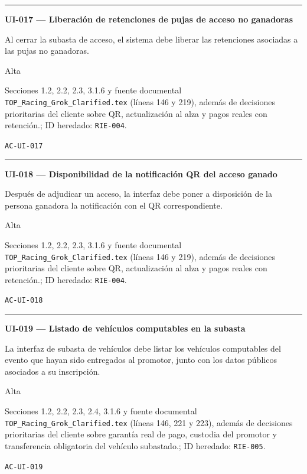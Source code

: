 \documentclass[10pt,letterpaper]{article}
\begin{document}
\vspace{0.25em}\hrule\vspace{0.65em}
\noindent\textbf{UI-017 --- Liberación de retenciones de pujas de acceso no ganadoras}\par
\begin{description}[style=nextline,leftmargin=3.15cm,labelwidth=2.8cm,font=\normalfont\bfseries]
\item[Obligación] Al cerrar la subasta de acceso, el sistema debe liberar las retenciones asociadas a las pujas no ganadoras.
\item[Prioridad] Alta
\item[Procedencia] Secciones 1.2, 2.2, 2.3, 3.1.6 y fuente documental \texttt{TOP\_Racing\_Grok\_Clarified.tex} (líneas 146 y 219), además de decisiones prioritarias del cliente sobre QR, actualización al alza y pagos reales con retención.; ID heredado: \texttt{RIE-004}.
\item[Verificación] \texttt{AC-UI-017}
\end{description}
\vspace{0.25em}\hrule\vspace{0.65em}
\noindent\textbf{UI-018 --- Disponibilidad de la notificación QR del acceso ganado}\par
\begin{description}[style=nextline,leftmargin=3.15cm,labelwidth=2.8cm,font=\normalfont\bfseries]
\item[Obligación] Después de adjudicar un acceso, la interfaz debe poner a disposición de la persona ganadora la notificación con el QR correspondiente.
\item[Prioridad] Alta
\item[Procedencia] Secciones 1.2, 2.2, 2.3, 3.1.6 y fuente documental \texttt{TOP\_Racing\_Grok\_Clarified.tex} (líneas 146 y 219), además de decisiones prioritarias del cliente sobre QR, actualización al alza y pagos reales con retención.; ID heredado: \texttt{RIE-004}.
\item[Verificación] \texttt{AC-UI-018}
\end{description}
\vspace{0.25em}\hrule\vspace{0.65em}
\noindent\textbf{UI-019 --- Listado de vehículos computables en la subasta}\par
\begin{description}[style=nextline,leftmargin=3.15cm,labelwidth=2.8cm,font=\normalfont\bfseries]
\item[Obligación] La interfaz de subasta de vehículos debe listar los vehículos computables del evento que hayan sido entregados al promotor, junto con los datos públicos asociados a su inscripción.
\item[Prioridad] Alta
\item[Procedencia] Secciones 1.2, 2.2, 2.3, 2.4, 3.1.6 y fuente documental \texttt{TOP\_Racing\_Grok\_Clarified.tex} (líneas 146, 221 y 223), además de decisiones prioritarias del cliente sobre garantía real de pago, custodia del promotor y transferencia obligatoria del vehículo subastado.; ID heredado: \texttt{RIE-005}.
\item[Verificación] \texttt{AC-UI-019}
\end{description}
\end{document}
